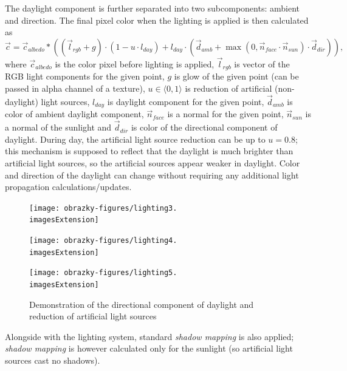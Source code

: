 The daylight component is further separated into two subcomponents: ambient and direction. The final pixel color when the lighting is applied is then calculated as
\begin{equation} \label{lightingEq}
	\vec{c} = \vec{c}_{albedo} * \left((\vec{l}_{rgb} + g) \cdot (1 - u \cdot l_{day}) + l_{day} \cdot \left(\vec{d}_{amb} + \max(0, \vec{n}_{face} \cdot \vec{n}_{sun}) \cdot \vec{d}_{dir}\right)\right) \text{,}
\end{equation}
where $\vec{c}_{albedo}$ is the color pixel before lighting is applied, $\vec{l}_{rgb}$ is vector of the RGB light components for the given point, $g$ is glow of the given point (can be passed in alpha channel of a texture), $u \in \langle 0,1 \rangle$ is reduction of artificial (non-daylight) light sources, $l_{day}$ is daylight component for the given point, $\vec{d}_{amb}$ is color of ambient daylight component, $\vec{n}_{face}$ is a normal for the given point, $\vec{n}_{sun}$ is a normal of the sunlight and $\vec{d}_{dir}$ is color of the directional component of daylight. During day, the artificial light source reduction can be up to $u = 0.8$; this mechanism is supposed to reflect that the daylight is much brighter than artificial light sources, so the artificial sources appear weaker in daylight. Color and direction of the daylight can change without requiring any additional light propagation calculations/updates.

\begin{figure}[H]
	\centering
	\begin{minipage}[t]{0.32\textwidth}
		\texttt{[image: obrazky-figures/lighting3.\\imagesExtension]}
	\end{minipage}
	\hfill
	\begin{minipage}[t]{0.32\textwidth}
		\texttt{[image: obrazky-figures/lighting4.\\imagesExtension]}
	\end{minipage}
	\hfill
	\begin{minipage}[t]{0.32\textwidth}
		\texttt{[image: obrazky-figures/lighting5.\\imagesExtension]}
	\end{minipage}
	\caption{Demonstration of the directional component of daylight and reduction of artificial light sources}
\end{figure}

Alongside with the lighting system, standard \textit{shadow mapping} is also applied; \textit{shadow mapping} is however calculated only for the sunlight (so artificial light sources cast no shadows).

